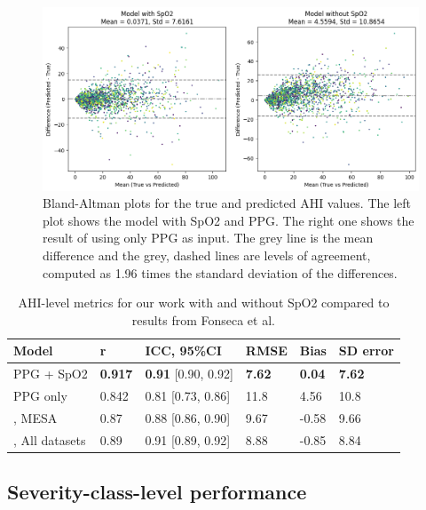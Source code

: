 \begin{figure}
    \centering
    \includegraphics[width=\textwidth]{images/BlandAltmanPlots}
    \caption{Bland-Altman plots for the true and predicted AHI values. The left plot shows the model with SpO2 and PPG. The right one shows the result of using only PPG as input. The grey line is the mean difference and the grey, dashed lines are levels of agreement, computed as 1.96 times the standard deviation of the differences.}
    \label{fig:bland-altman-plots}
\end{figure}

\renewcommand{\arraystretch}{1.5}
\begin{table}
    \centering
    \begin{tabular}{ l p{1cm} p{2.5cm} p{1cm} p{1cm} p{1.5cm} }
        Model & r & ICC, 95\%CI & RMSE & Bias & SD error \\
        \hline
        PPG + SpO2 & \textbf{0.917} & \textbf{0.91} [0.90, 0.92] & \textbf{7.62} & \textbf{0.04} & \textbf{7.62} \\
        PPG only   & 0.842 & 0.81 [0.73, 0.86] & 11.8 & 4.56 & 10.8 \\
        \hline
        \cite{fonseca2024estimating}, MESA & 0.87 & 0.88 [0.86, 0.90] & 9.67 & -0.58 & 9.66 \\
        \cite{fonseca2024estimating}, All datasets & 0.89 & 0.91 [0.89, 0.92] & 8.88 & -0.85 & 8.84 \\
    \end{tabular}
    \caption{AHI-level metrics for our work with and without SpO2 compared to results from Fonseca et al. \label{tab:ahi-level-metrics}}
\end{table}

\subsection*{Severity-class-level performance}

